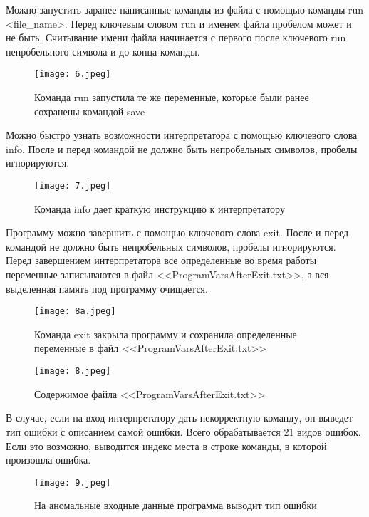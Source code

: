 \documentclass[a4paper,14pt]{extarticle}
\begin{document}
Можно запустить заранее написанные команды из файла с помощью команды run <file\_name>. Перед ключевым словом run и именем файла
пробелом может и не быть. Считывание имени файла начинается с первого после ключевого run непробельного символа и до конца команды.

\begin{figure}[h!]
	\begin{center}
		\texttt{[image: 6.jpeg]}
	\end{center}
	\caption{Команда run запустила те же переменные, которые были ранее сохранены командой save}
\end{figure}

Можно быстро узнать возможности интерпретатора с помощью ключевого слова info. После и перед командой не должно быть непробельных символов, пробелы игнорируются.

\begin{figure}[h!]
	\begin{center}
		\texttt{[image: 7.jpeg]}
	\end{center}
	\caption{Команда info дает краткую инструкцию к интерпретатору}
\end{figure}

Программу можно завершить с помощью ключевого слова exit. После и перед командой не должно быть непробельных символов, пробелы игнорируются. Перед завершением интерпретатора все определенные во время работы переменные записываются в файл <<ProgramVarsAfterExit.txt>>, а вся выделенная память под программу очищается.
\begin{figure}[h!]
	\begin{center}
		\texttt{[image: 8a.jpeg]}
	\end{center}
	\caption{Команда exit закрыла программу и сохранила определенные переменные в файл <<ProgramVarsAfterExit.txt>>}
\end{figure}

\begin{figure}[h!]
	\begin{center}
		\texttt{[image: 8.jpeg]}
	\end{center}
	\caption{Содержимое файла <<ProgramVarsAfterExit.txt>>}
\end{figure}

В случае, если на вход интерпретатору дать некорректную команду, он выведет тип ошибки с описанием самой ошибки. Всего обрабатывается
21 видов ошибок. Если это возможно, выводится индекс места в строке команды, в которой произошла ошибка.
\begin{figure}[h!]
	\begin{center}
		\texttt{[image: 9.jpeg]}
	\end{center}
	\caption{На аномальные входные данные программа выводит тип ошибки}
\end{figure}
\end{document}
